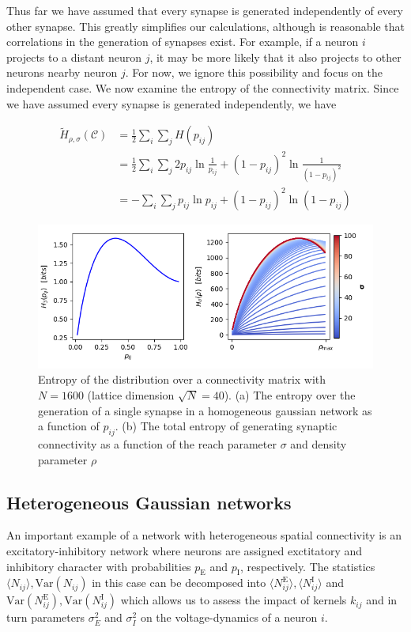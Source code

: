 \documentclass{ucetd}
\begin{document}
Thus far we have assumed that every synapse is generated independently of every other synapse. This greatly simplifies our calculations, although is reasonable that correlations in the generation of synapses exist. For example, if a neuron $i$ projects to a distant neuron $j$, it may be more likely that it also projects to other neurons nearby neuron $j$. For now, we ignore this possibility and focus on the independent case. We now examine the entropy of the connectivity matrix. Since we have assumed every synapse is generated independently, we have

\begin{align*}
\tilde{H}_{\rho,\sigma}(\mathcal{C}) &= \frac{1}{2}\sum_{i}\sum_{j}H(p_{ij})\\
&= \frac{1}{2}\sum_{i}\sum_{j} 2p_{ij}\ln\frac{1}{p_{ij}} + (1-p_{ij})^{2}\ln\frac{1}{(1-p_{ij})^{2}}\\
&= -\sum_{i}\sum_{j}p_{ij}\ln p_{ij} + (1-p_{ij})^{2}\ln (1-p_{ij})
\end{align*}


\begin{figure}
\centering
\includegraphics[width=125mm]{fig_7}
\caption{Entropy of the distribution over a connectivity matrix with $N=1600$ (lattice dimension $\sqrt{N}=40$). (a) The entropy over the generation of a single synapse in a homogeneous gaussian network as a function of $p_{ij}$. (b) The total entropy of generating synaptic connectivity as a function of the reach parameter $\sigma$ and density parameter $\rho$}
\end{figure}




\subsection{Heterogeneous Gaussian networks}

An important example of a network with heterogeneous spatial connectivity is an excitatory-inhibitory network where neurons are assigned exctitatory and inhibitory character with probabilities $p_{\mathrm{E}}$ and $p_{\mathrm{I}}$, respectively. The statistics $\langle N_{ij}\rangle, \mathrm{Var}(N_{ij})$ in this case can be decomposed into $\langle N_{ij}^{\mathrm{E}}\rangle, \langle N_{ij}^{\mathrm{I}}\rangle$ and $\mathrm{Var}(N_{ij}^{\mathrm{E}}), \mathrm{Var}(N_{ij}^{\mathrm{I}})$ which allows us to assess the impact of kernels $k_{ij}$ and in turn parameters $\sigma_{E}^{2}$ and $\sigma_{I}^{2}$ on the voltage-dynamics of a neuron $i$.
\end{document}
